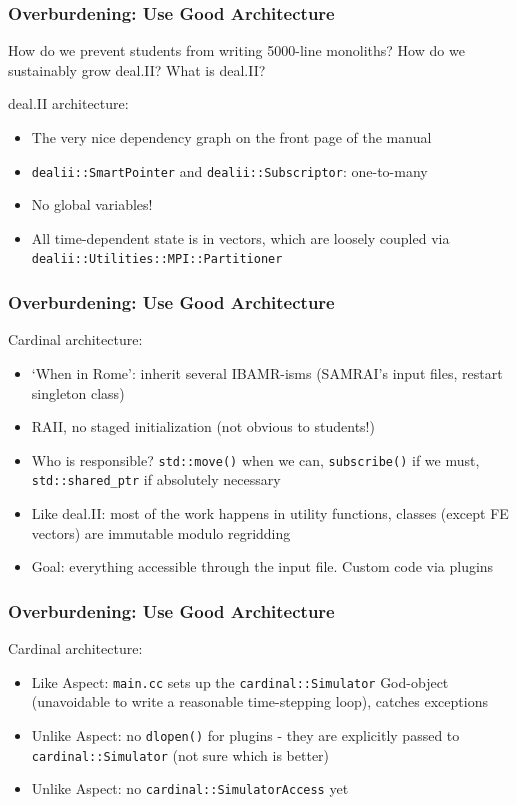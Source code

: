 \documentclass[8pt]{beamer}
\begin{document}
\begin{frame}
  \frametitle{Overburdening: Use Good Architecture}

    How do we prevent students from writing 5000-line monoliths? How do we
    sustainably grow deal.II? What is deal.II?

    deal.II architecture:
    \begin{itemize}
      \item The very nice dependency graph on the front page of the manual
      \item \texttt{dealii::SmartPointer} and \texttt{dealii::Subscriptor}: one-to-many
      \item No global variables!
      \item All time-dependent state is in vectors, which are loosely coupled
        via \texttt{dealii::Utilities::MPI::Partitioner}
    \end{itemize}
\end{frame}

\begin{frame}
  \frametitle{Overburdening: Use Good Architecture}

    Cardinal architecture:
    \begin{itemize}
      \item `When in Rome': inherit several IBAMR-isms (SAMRAI's input files,
        restart singleton class)
      \item RAII, no staged initialization (not obvious to students!)
      \item Who is responsible? \texttt{std::move()} when we can,
        \texttt{subscribe()} if we must, \texttt{std::shared\_ptr} if absolutely
        necessary
      \item Like deal.II: most of the work happens in utility functions, classes
        (except FE vectors) are immutable modulo regridding
      \item Goal: everything accessible through the input file. Custom code via
        plugins
    \end{itemize}
\end{frame}

\begin{frame}
  \frametitle{Overburdening: Use Good Architecture}

    Cardinal architecture:
    \begin{itemize}
      \item Like Aspect: \texttt{main.cc} sets up the \texttt{cardinal::Simulator}
        God-object (unavoidable to write a reasonable time-stepping loop),
        catches exceptions
      \item Unlike Aspect: no \texttt{dlopen()} for plugins - they are
        explicitly passed to \texttt{cardinal::Simulator} (not sure which is better)
      \item Unlike Aspect: no \texttt{cardinal::SimulatorAccess} yet
    \end{itemize}
\end{frame}
\end{document}
